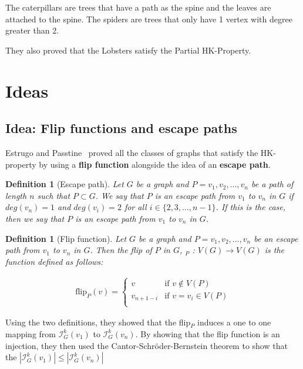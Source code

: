 \documentclass[11pt,a4paper]{article}
\newtheorem{definition}[theorem]{Definition}
\theoremstyle{definition}
\begin{document}
The caterpillars are trees that have a path as the spine and the leaves are attached to the spine. The spiders are trees that only have 1 vertex with degree greater than 2.

They also proved that the Lobsters satisfy the Partial HK-Property.

\section{Ideas}

\subsection{Idea: Flip functions and escape paths}

Estrugo and Passtine~\cite{MR4245360} proved all the classes of graphs that satisfy the HK-property by using a \textbf{flip function} alongside the idea of an \textbf{escape path}.

\begin{definition}[Escape path]
	Let $G$ be a graph and $P = v_1,v_2,\ldots,v_n$ be a path of length $n$ such that $P \subset G$. We say that $P$ is an escape path from $v_1$ to $v_n$ in $G$ if $deg(v_n) = 1$ and $deg(v_i) = 2$ for all $i \in \{2,3,\ldots,n-1\}$. If this is the case, then we say that $P$ is an escape path from $v_1$ to $v_n$ in $G$.
\end{definition}

\begin{definition}[Flip function]
	Let $G$ be a graph and $P = v_1,v_2,\ldots,v_n$ be an escape path from $v_1$ to $v_n$ in $G$. Then the flip of $P$ in $G$, $_P$ : $V(G) \rightarrow V(G)$ is the function defined as follows:

	\begin{align*}
		\text{flip}_P(v) = \begin{cases}
			                   v             & \text{if } v \not\in V(P)   \\
			                   v_{n + 1 - i} & \text{if } v = v_i \in V(P) \\
		                   \end{cases}
	\end{align*}
\end{definition}

Using the two definitions, they showed that the flip$_P$ induces a one to one mapping from $\mathcal{I}^k_G(v_1)$ to $\mathcal{I}^k_G(v_n)$. By showing that the flip function is an injection, they then used the Cantor-Schröder-Bernstein theorem to show that the $|\mathcal{I}^k_G(v_1)| \leq |\mathcal{I}^k_G(v_n)|$
\end{document}
